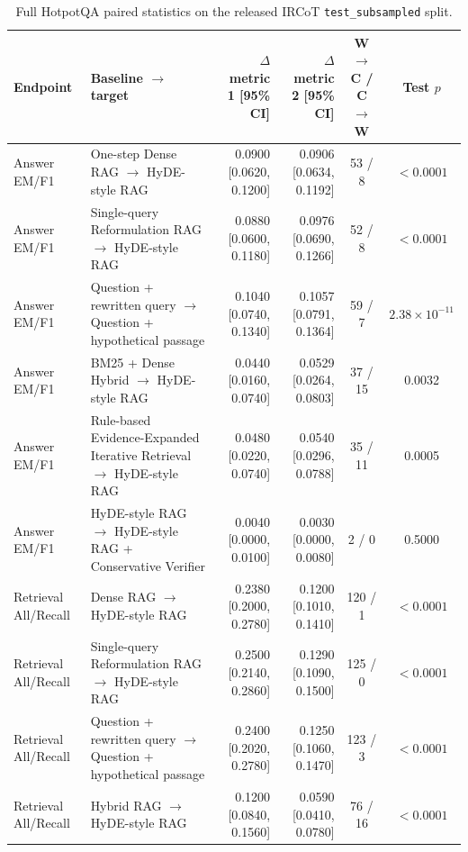 \begin{table}
\centering
\caption{Full HotpotQA paired statistics on the released IRCoT \texttt{test\_subsampled} split.}
\label{tab:hotpotqa_paired_statistics}
\footnotesize
\setlength{\tabcolsep}{3pt}
\begin{tabularx}{\textheight}{>{\raggedright\arraybackslash}p{0.15\textheight}
                            >{\raggedright\arraybackslash}X
                            r r c c}
\toprule
Endpoint & Baseline $\rightarrow$ target & $\Delta$ metric 1 [95\% CI] & $\Delta$ metric 2 [95\% CI] & W$\rightarrow$C / C$\rightarrow$W & Test $p$ \\
\midrule
Answer EM/F1 & One-step Dense RAG $\rightarrow$ HyDE-style RAG & 0.0900 [0.0620, 0.1200] & 0.0906 [0.0634, 0.1192] & 53 / 8 & $<0.0001$ \\
Answer EM/F1 & Single-query Reformulation RAG $\rightarrow$ HyDE-style RAG & 0.0880 [0.0600, 0.1180] & 0.0976 [0.0690, 0.1266] & 52 / 8 & $<0.0001$ \\
Answer EM/F1 & Question + rewritten query $\rightarrow$ Question + hypothetical passage & 0.1040 [0.0740, 0.1340] & 0.1057 [0.0791, 0.1364] & 59 / 7 & $2.38{\times}10^{-11}$ \\
Answer EM/F1 & BM25 + Dense Hybrid $\rightarrow$ HyDE-style RAG & 0.0440 [0.0160, 0.0740] & 0.0529 [0.0264, 0.0803] & 37 / 15 & 0.0032 \\
Answer EM/F1 & Rule-based Evidence-Expanded Iterative Retrieval $\rightarrow$ HyDE-style RAG & 0.0480 [0.0220, 0.0740] & 0.0540 [0.0296, 0.0788] & 35 / 11 & 0.0005 \\
Answer EM/F1 & HyDE-style RAG $\rightarrow$ HyDE-style RAG + Conservative Verifier & 0.0040 [0.0000, 0.0100] & 0.0030 [0.0000, 0.0080] & 2 / 0 & 0.5000 \\
\midrule
Retrieval All/Recall & Dense RAG $\rightarrow$ HyDE-style RAG & 0.2380 [0.2000, 0.2780] & 0.1200 [0.1010, 0.1410] & 120 / 1 & $<0.0001$ \\
Retrieval All/Recall & Single-query Reformulation RAG $\rightarrow$ HyDE-style RAG & 0.2500 [0.2140, 0.2860] & 0.1290 [0.1090, 0.1500] & 125 / 0 & $<0.0001$ \\
Retrieval All/Recall & Question + rewritten query $\rightarrow$ Question + hypothetical passage & 0.2400 [0.2020, 0.2780] & 0.1250 [0.1060, 0.1470] & 123 / 3 & $<0.0001$ \\
Retrieval All/Recall & Hybrid RAG $\rightarrow$ HyDE-style RAG & 0.1200 [0.0840, 0.1560] & 0.0590 [0.0410, 0.0780] & 76 / 16 & $<0.0001$ \\

\end{tabularx}
\end{table}
